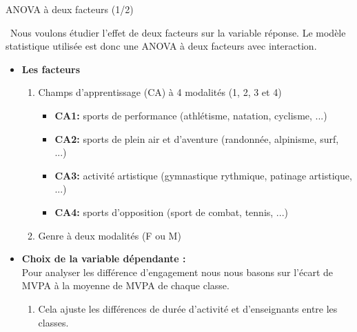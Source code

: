 \documentclass{beamer}
\begin{document}
	\begin{frame}{ANOVA à deux facteurs (1/2)}
		\begin{tcolorbox}[colframe=mycolor, colback=white, boxrule=1pt]
			\faExclamationTriangle \, Nous voulons étudier l'effet de deux facteurs sur la variable réponse. Le modèle statistique utilisée est donc une ANOVA à deux facteurs avec interaction.
		\end{tcolorbox}
		\begin{itemize}
			\item \textbf{Les facteurs}
			\begin{enumerate}
				\item Champs d'apprentissage (CA) à 4 modalités (1, 2, 3 et 4)
				\begin{itemize}
					\item \textbf{CA1:} sports de performance (athlétisme, natation, cyclisme, ...)
					\item \textbf{CA2:} sports de plein air et d'aventure (randonnée, alpinisme, surf, ...)
					\item \textbf{CA3:} activité artistique (gymnastique rythmique, patinage artistique, ...)
					\item \textbf{CA4:} sports d'opposition (sport de combat, tennis, ...)
				\end{itemize}
				\item Genre à deux modalités (F ou M)
			\end{enumerate}
			\item \textbf{Choix de la variable dépendante :}\\
			Pour analyser les différence d'engagement nous nous basons sur l'écart de MVPA à la moyenne de MVPA de chaque classe.
			\begin{enumerate}
				\item Cela ajuste les différences de durée d'activité et d'enseignants entre les classes.
			\end{enumerate}
			
		\end{itemize}
		
		
	\end{frame}
	
\end{document}
